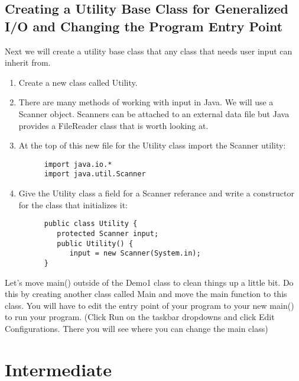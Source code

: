 \documentclass{article}
\begin{document}
\begin{steps}
\subsection
{Creating a Utility Base Class for Generalized I/O and Changing the Program Entry Point}
      \item Next we will create a utility base class that any class that needs user input
         can inherit from.
   \begin{enumerate}[label=\Alph*.]
      \item Create a new class called Utility.
      \item There are many methods of working with input in Java. We will use a Scanner object.
         Scanners can be attached to an external data file but Java provides a FileReader class
         that is worth looking at.
      \item At the top of this new file for the Utility class import the Scanner utility:
         \begin{verbatim}
      import java.io.* 
      import java.util.Scanner
         \end{verbatim}
      \item Give the Utility class a field for a Scanner referance and write a constructor
         for the class that initializes it:
         \begin{verbatim}
      public class Utility {
         protected Scanner input;
         public Utility() {
            input = new Scanner(System.in);
      }
         \end{verbatim}
   \end{enumerate}
      \item Let's move main() outside of the Demo1 class to clean things up a little bit.
         Do this by creating another class called Main and move the main function to
         this class. You will have to edit the entry point of your program to your new main()
         to run your program. (Click Run on the taskbar dropdowns and click Edit Configurations.
         There you will see where you can change the main class)
   \end{steps}
\section{Intermediate}
\end{document}
